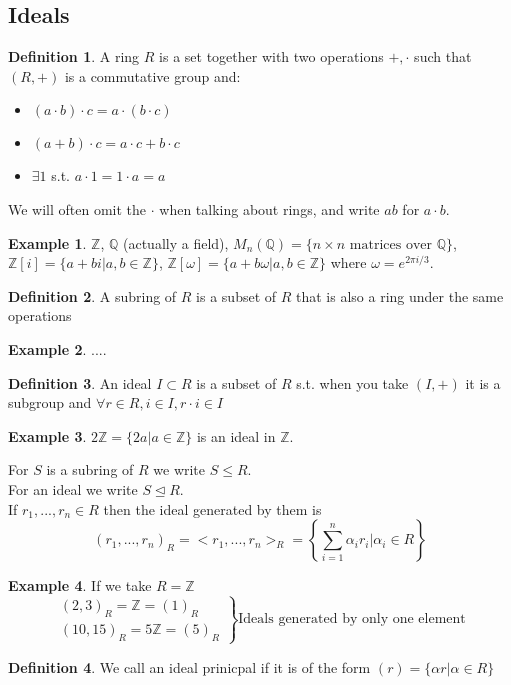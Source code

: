\documentclass{article}
\theoremstyle{definition}
\newtheorem*{defn}{Definition}
\newtheorem*{ex}{Example}
\newcommand{\ZZ}{\mathbb{Z}}
\newcommand{\QQ}{\mathbb{Q}}
\begin{document}
\subsection{Ideals}
\begin{defn}
A ring $R$ is a set together with two operations $+,\cdot$ such that $(R,+)$ is a commutative group and:
\begin{itemize}
\item $(a\cdot b)\cdot c = a\cdot (b\cdot c)$
\item $(a+b)\cdot c = a\cdot c+b\cdot c$
\item $\exists 1$ s.t. $a\cdot 1 = 1\cdot a = a$
\end{itemize}
\end{defn}
We will often omit the $\cdot$ when talking about rings, and write $ab$ for $a\cdot b$.
\begin{ex}
$\ZZ$, $\QQ$ (actually a field), $M_n(\QQ) = \{n\times n \text{ matrices over } \QQ\}$, $\ZZ[i] = \{a+bi|a,b \in\ZZ\}$, $\ZZ[\omega] = \{a+b\omega |a,b \in\ZZ\}$ where $\omega = e^{2\pi i /3}$.
\end{ex}
\begin{defn} A subring of $R$ is a subset of $R$ that is also a ring under the same operations\end{defn}
\begin{ex} .... \end{ex}
\begin{defn} An ideal $I \subset R$ is a subset of $R$ s.t. when you take $(I,+)$ it is a subgroup and $\forall r\in R, i\in I, r\cdot i \in I$
\end{defn}
\begin{ex}
$2\ZZ = \{2a|a\in\ZZ\}$ is an ideal in $\ZZ$.
\end{ex}
For $S$ is a subring of $R$ we write $S\leq R$. \\
For an ideal we write $S \trianglelefteq R$. \\
If $r_1,...,r_n \in R$ then the ideal generated by them is
$$(r_1,...,r_n)_R = <r_1,...,r_n>_R = \left\{ \sum_{i=1}^n \alpha_i r_i | \alpha_i \in R \right\}$$
\begin{ex}
If we take $R = \ZZ$
$$\left. \begin{matrix}
(2,3)_R = \ZZ = (1)_R \\
(10,15)_R = 5\ZZ = (5)_R
\end{matrix} \right\} \text{Ideals generated by only one element}$$
\end{ex}
\begin{defn}
We call an ideal prinicpal if it is of the form $(r) = \{\alpha r|\alpha\in R\}$
\end{defn}
\end{document}
